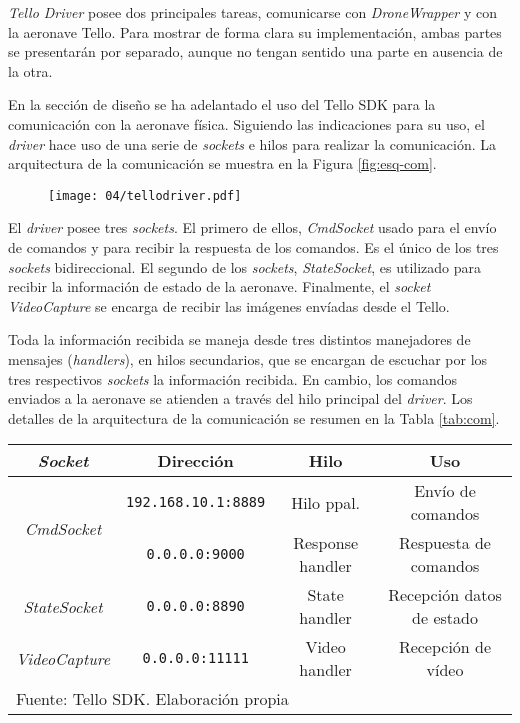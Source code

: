 \documentclass[../main.tex]{subfiles}
\begin{document}
\emph{Tello Driver} posee dos principales tareas, comunicarse con \emph{DroneWrapper} y con la aeronave Tello. Para mostrar de forma clara su implementación, ambas partes se presentarán por separado, aunque no tengan sentido una parte en ausencia de la otra.

En la sección de diseño se ha adelantado el uso del Tello SDK para la comunicación con la aeronave física. Siguiendo las indicaciones para su uso, el \emph{driver} hace uso de una serie de \emph{sockets} e hilos para realizar la comunicación. La arquitectura de la comunicación se muestra en la Figura \ref{fig:esq-com}.

\begin{figure}[!ht]
 	{\texttt{[image: 04/tellodriver.pdf]}}
\end{figure}

El \emph{driver} posee tres \emph{sockets}. El primero de ellos, \emph{CmdSocket} usado para el envío de comandos y para recibir la respuesta de los comandos. Es el único de los tres \emph{sockets} bidireccional. El segundo de los \emph{sockets}, \emph{StateSocket}, es utilizado para recibir la información de estado de la aeronave. Finalmente, el \emph{socket} \emph{VideoCapture} se encarga de recibir las imágenes envíadas desde el Tello.

Toda la información recibida se maneja desde tres distintos manejadores de mensajes (\emph{handlers}), en hilos secundarios, que se encargan de escuchar por los tres respectivos \emph{sockets} la información recibida. En cambio, los comandos enviados a la aeronave se atienden a través del hilo principal del \emph{driver}. Los detalles de la arquitectura de la comunicación se resumen en la Tabla \ref{tab:com}.

\begin{table}[H]
	{\begin{tabular}{|c|c|c|c|}
		\hline
		\textbf{\emph{Socket}} & \textbf{Dirección} & \textbf{Hilo} & \textbf{Uso} \\
		\hline
		\multirow{2}{*}{\emph{CmdSocket}} & \lstinline{192.168.10.1:8889} & Hilo ppal. & Envío de comandos \\
		\cline{2-4}
         & \lstinline{0.0.0.0:9000} & Response handler & Respuesta de comandos \\
		\hline
        \emph{StateSocket} & \lstinline{0.0.0.0:8890} & State handler & Recepción datos de estado \\
        \hline
        \emph{VideoCapture} & \lstinline{0.0.0.0:11111} & Video handler & Recepción de vídeo \\
        \hline
		\multicolumn{4}{l}{Fuente: Tello SDK. Elaboración propia}
	\end{tabular}}
\end{table}
\end{document}
